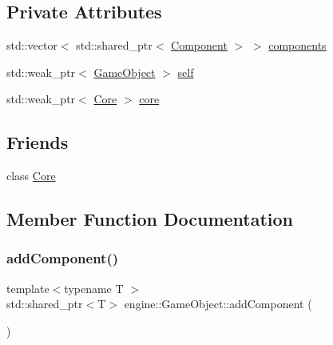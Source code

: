 \subsection*{Private Attributes}
\begin{DoxyCompactItemize}
\item 
std\+::vector$<$ std\+::shared\+\_\+ptr$<$ \mbox{\hyperlink{classengine_1_1_component}{Component}} $>$ $>$ \mbox{\hyperlink{classengine_1_1_game_object_a46356123cbc0e594f6f8eeb3bdd054a5}{components}}
\item 
std\+::weak\+\_\+ptr$<$ \mbox{\hyperlink{classengine_1_1_game_object}{Game\+Object}} $>$ \mbox{\hyperlink{classengine_1_1_game_object_a4214abdb224cfbf47f9ee42cd3223250}{self}}
\item 
std\+::weak\+\_\+ptr$<$ \mbox{\hyperlink{classengine_1_1_core}{Core}} $>$ \mbox{\hyperlink{classengine_1_1_game_object_a7ab760fa75feeec53424e717f394c3dd}{core}}
\end{DoxyCompactItemize}
\subsection*{Friends}
\begin{DoxyCompactItemize}
\item 
class \mbox{\hyperlink{classengine_1_1_game_object_a4107254ac74f90d4f91e810d755b98c2}{Core}}
\end{DoxyCompactItemize}


\subsection{Member Function Documentation}
\mbox{\label{classengine_1_1_game_object_ace1c57763236e72b58bf5b0da63b196d}} 
\subsubsection{\texorpdfstring{add\+Component()}{addComponent()}\hspace{0.1cm}{\footnotesize\ttfamily [1/4]}}
{\footnotesize\ttfamily template$<$typename T $>$ \\
std\+::shared\+\_\+ptr$<$T$>$ engine\+::\+Game\+Object\+::add\+Component (\begin{DoxyParamCaption}{ }\end{DoxyParamCaption})\hspace{0.3cm}{\ttfamily [inline]}}

